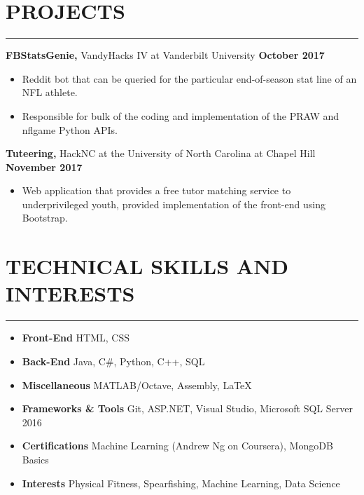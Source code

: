 \documentclass[11pt]{article} %
\begin{document}
		\vspace{.1cm}
	
	\section*{PROJECTS}
		\hrule \relax
		\vspace{.4cm}
		
		\noindent \textbf{FBStatsGenie,} VandyHacks IV at Vanderbilt University \hfill\textbf{October 2017}
		\begin{itemize}[noitemsep,nolistsep, label={-}]
			\item Reddit bot that can be queried for the particular end-of-season stat line of an NFL athlete.
			\item Responsible for bulk of the coding and implementation of the PRAW and nflgame Python APIs.
		\end{itemize}
		
		\vspace{.1cm}
	
		\noindent \textbf{Tuteering,} HackNC at the University of North Carolina at Chapel Hill \hfill\textbf{November 2017}
		\begin{itemize}[noitemsep,nolistsep, label={-}]
			\item Web application that provides a free tutor matching service to underprivileged youth, provided implementation of the front-end using Bootstrap.
		\end{itemize}
	
		\vspace{.1cm}
	
	\section*{TECHNICAL SKILLS AND INTERESTS}
		\hrule \relax
		\vspace{.4cm}
		
		\begin{itemize}[noitemsep,nolistsep, label={}]
			\item \textbf{Front-End}                  \tabto*{5cm} HTML, CSS
			\item \textbf{Back-End}                   \tabto*{5cm} Java, C\#, Python, C++, SQL
			\item \textbf{Miscellaneous}            \tabto*{5cm} MATLAB/Octave, Assembly, \LaTeX
			\item \textbf{Frameworks \& Tools}  \tabto*{5cm} Git, ASP.NET, Visual Studio, Microsoft SQL Server 2016
			\item \textbf{Certifications}              \tabto*{5cm} Machine Learning (Andrew Ng on Coursera), MongoDB Basics
			\item \textbf{Interests}                     \tabto*{5cm} Physical Fitness, Spearfishing, Machine Learning, Data Science
		\end{itemize}
		
		\vspace{.1cm}
	
\end{document}
